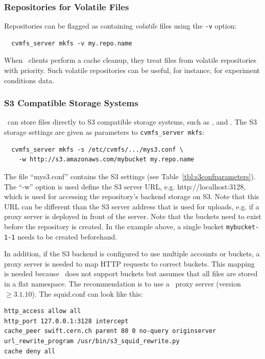 \subsubsection{Repositories for Volatile Files}
Repositories can be flagged as containing \emph{volatile} files using the \texttt{-v} option:
\begin{verbatim}
  cvmfs_server mkfs -v my.repo.name
\end{verbatim}
When \cvmfs\ clients perform a cache cleanup, they treat files from volatile repositories with priority.
Such volatile repositories can be useful, for instance, for experiment conditions data.

\subsubsection{S3 Compatible Storage Systems}
\label{sct:s3storagesetup}

\cvmfs\ can store files directly to S3 compatible storage systems, such as ,  and .
The S3 storage settings are given as parameters to \texttt{cvmfs\_server mkfs}:
\begin{verbatim}
  cvmfs_server mkfs -s /etc/cvmfs/.../mys3.conf \
    -w http://s3.amazonaws.com/mybucket my.repo.name
\end{verbatim}

The file ``mys3.conf'' contains the S3 settings (see Table~\ref{tbl:s3confparameters}).
The ``-w'' option is used define the S3 server URL, e.g. http://localhost:3128, which is used for accessing the repository's backend storage on S3.
Note that this URL can be different than the S3 server address that is used for uploads, e.g. if a proxy server is deployed in front of the server.
Note that the buckets need to exist before the repository is created.
In the example above, a single bucket \texttt{mybucket-1-1} needs to be created beforehand.


In addition, if the S3 backend is configured to use multiple accounts or buckets, a proxy server is needed to map HTTP requests to correct buckets.
This mapping is needed because \cvmfs\ does not support buckets but assumes that all files are stored in a flat namespace.
The recommendation is to use a \squid\ proxy server (version $\geq 3.1.10$).
The squid.conf can look like this:
\begin{verbatim}
http_access allow all
http_port 127.0.0.1:3128 intercept
cache_peer swift.cern.ch parent 80 0 no-query originserver
url_rewrite_program /usr/bin/s3_squid_rewrite.py
cache deny all
\end{verbatim}

